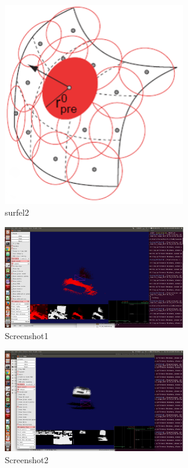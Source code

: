 \documentclass[12pt,twoside]{article}
\begin{document}
\begin{figure}[h]
    \centering
    \includegraphics[width=0.7\textwidth]{figures/surfel2}
    \caption{surfel2}
    \label{fig:surfel2}
\end{figure}

\begin{figure}[h]
    \centering
    \includegraphics[width=0.7\textwidth]{figures/Screenshot1}
    \caption{Screenshot1}
    \label{fig:Screenshot1}
\end{figure}

\begin{figure}[h]
    \centering
    \includegraphics[width=0.7\textwidth]{figures/Screenshot2}
    \caption{Screenshot2}
    \label{fig:Screenshot2}
\end{figure}
\end{document}
